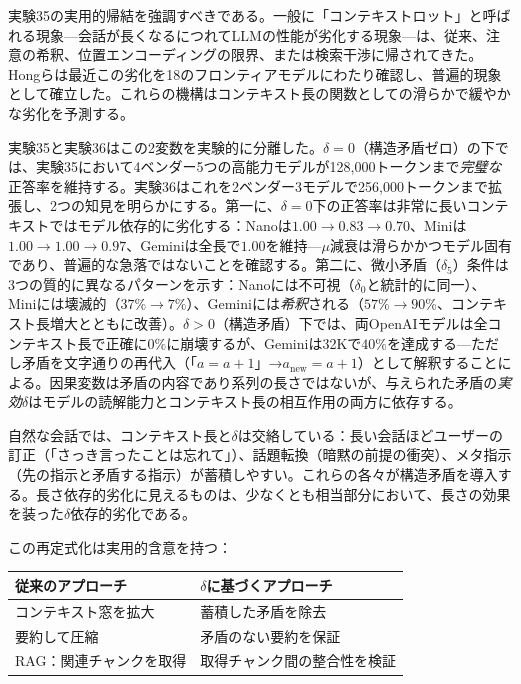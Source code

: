 \documentclass[11pt,a4paper]{article}
\begin{document}
実験35の実用的帰結を強調すべきである。一般に「コンテキストロット」と呼ばれる現象---会話が長くなるにつれてLLMの性能が劣化する現象---は、従来、注意の希釈、位置エンコーディングの限界、または検索干渉\cite{liu2024}に帰されてきた。Hongら\cite{hong2025contextrot}は最近この劣化を18のフロンティアモデルにわたり確認し、普遍的現象として確立した。これらの機構はコンテキスト長の関数としての滑らかで緩やかな劣化を予測する。

実験35と実験36はこの2変数を実験的に分離した。$\delta = 0$（構造矛盾ゼロ）の下では、実験35において4ベンダー5つの高能力モデルが128{,}000トークンまで\emph{完璧な}正答率を維持する。実験36はこれを2ベンダー3モデルで256{,}000トークンまで拡張し、2つの知見を明らかにする。第一に、$\delta = 0$下の正答率は非常に長いコンテキストではモデル依存的に劣化する：Nanoは$1.00 \to 0.83 \to 0.70$、Miniは$1.00 \to 1.00 \to 0.97$、Geminiは全長で$1.00$を維持---$\mu$減衰は滑らかかつモデル固有であり、普遍的な急落ではないことを確認する。第二に、微小矛盾（$\delta_5$）条件は3つの質的に異なるパターンを示す：Nanoには不可視（$\delta_0$と統計的に同一）、Miniには壊滅的（$37\% \to 7\%$）、Geminiには\emph{希釈}される（$57\% \to 90\%$、コンテキスト長増大とともに改善）。$\delta > 0$（構造矛盾）下では、両OpenAIモデルは全コンテキスト長で正確に$0\%$に崩壊するが、Geminiは32Kで$40\%$を達成する---ただし矛盾を文字通りの再代入（「$a = a + 1$」→$a_{\text{new}} = a + 1$）として解釈することによる。因果変数は矛盾の内容であり系列の長さではないが、与えられた矛盾の\emph{実効}$\delta$はモデルの読解能力とコンテキスト長の相互作用の両方に依存する。

自然な会話では、コンテキスト長と$\delta$は交絡している：長い会話ほどユーザーの訂正（「さっき言ったことは忘れて」）、話題転換（暗黙の前提の衝突）、メタ指示（先の指示と矛盾する指示）が蓄積しやすい。これらの各々が構造矛盾を導入する。長さ依存的劣化に見えるものは、少なくとも相当部分において、長さの効果を装った$\delta$依存的劣化である。

この再定式化は実用的含意を持つ：

\begin{center}
\small
\begin{tabular}{ll}
\toprule
\textbf{従来のアプローチ} & \textbf{$\delta$に基づくアプローチ} \\
\midrule
コンテキスト窓を拡大 & 蓄積した矛盾を除去 \\
要約して圧縮 & 矛盾のない要約を保証 \\
RAG：関連チャンクを取得 & 取得チャンク間の整合性を検証 \\
\bottomrule
\end{tabular}
\end{center}
\end{document}
